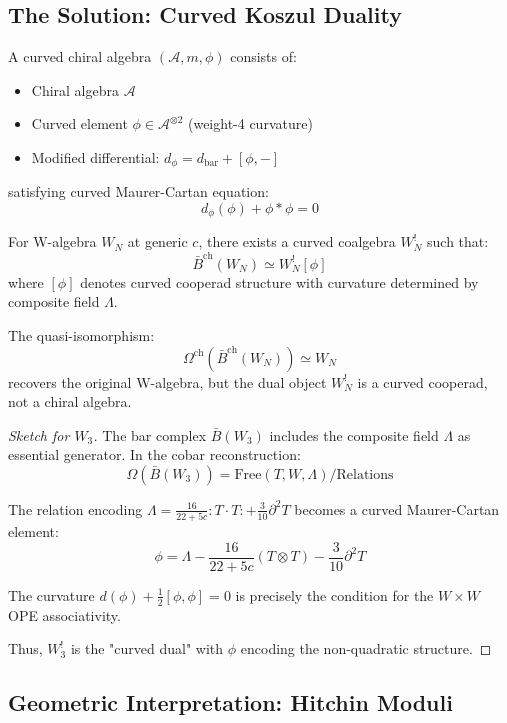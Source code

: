 \subsection{The Solution: Curved Koszul Duality}

\begin{definition}
A curved chiral algebra $(\mathcal{A}, m, \phi)$ consists of:
\begin{itemize}
\item Chiral algebra $\mathcal{A}$
\item Curved element $\phi \in \mathcal{A}^{\otimes 2}$ (weight-4 curvature)
\item Modified differential: $d_{\phi} = d_{\text{bar}} + [\phi, -]$
\end{itemize}
satisfying curved Maurer-Cartan equation:
$$d_{\phi}(\phi) + \phi * \phi = 0$$
\end{definition}

\begin{theorem}
\label{thm:curved-koszul-w}
For W-algebra $W_N$ at generic $c$, there exists a curved coalgebra $W_N^!$ such that:
$$\bar{B}^{\text{ch}}(W_N) \simeq W_N^![\phi]$$
where $[\phi]$ denotes curved cooperad structure with curvature determined by composite field $\Lambda$.

The quasi-isomorphism:
$$\Omega^{\text{ch}}(\bar{B}^{\text{ch}}(W_N)) \simeq W_N$$
recovers the original W-algebra, but the dual object $W_N^!$ is a curved cooperad, not a chiral algebra.
\end{theorem}

\begin{proof}[Sketch for $W_3$]
The bar complex $\bar{B}(W_3)$ includes the composite field $\Lambda$ as essential generator. In the cobar reconstruction:
$$\Omega(\bar{B}(W_3)) = \text{Free}(T, W, \Lambda) / \text{Relations}$$

The relation encoding $\Lambda = \frac{16}{22+5c} : T \cdot T : + \frac{3}{10}\partial^2 T$ becomes a curved Maurer-Cartan element:
$$\phi = \Lambda - \frac{16}{22+5c} (T \otimes T) - \frac{3}{10}\partial^2 T$$

The curvature $d(\phi) + \frac{1}{2}[\phi, \phi] = 0$ is precisely the condition for the $W \times W$ OPE associativity.

Thus, $W_3^!$ is the "curved dual" with $\phi$ encoding the non-quadratic structure.
\end{proof}

\subsection{Geometric Interpretation: Hitchin Moduli}

